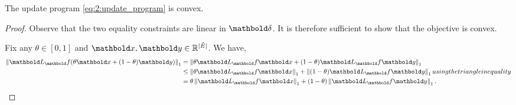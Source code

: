 \documentclass{tufte-handout}
\newcommand{\Etil}{\Tilde{E}}
\begin{document}
\begin{lem}
The update program \eqref{eq:2:update_program} is convex.
\end{lem}
\begin{proof}
Observe that the two equality constraints are linear in $\vdelta$. It is therefore sufficient to show that the objective is convex.

Fix any $\theta \in [0,1]$ and $\vx, \vy \in \R^{|\Etil|}$. We have, \begin{align*}
    \norm{\mL_\vf (\theta\vx + (1-\theta)\vy)}_1 &= \norm{\theta \mL_\vf \vx + (1-\theta) \mL_\vf \vy}_1 \\
    &\leq \norm{\theta \mL_\vf \vx}_1 + \norm{(1-\theta) \mL_\vf \vy}_1 \margintag{using the triangle inequality} \\
    &= \theta\norm{\mL_\vf \vx}_1 + (1-\theta)\norm{\mL_\vf \vy}_1. \qedhere
\end{align*}
\end{proof}
\end{document}

